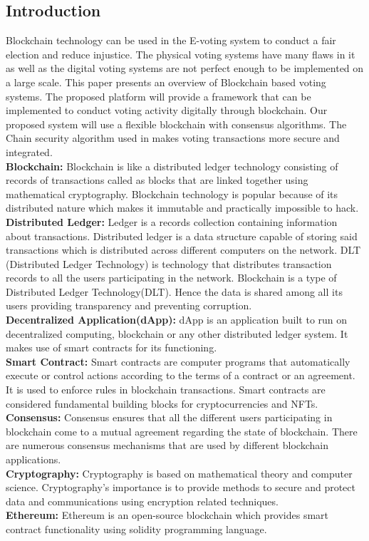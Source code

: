 \documentclass[oneside, 12pt]{book}
\begin{document}
		\subsection{Introduction}
			Blockchain technology can be used in the E-voting system to conduct a fair election and reduce injustice. The physical voting systems have many flaws in it as well as the digital voting systems are not perfect enough to be implemented on a large scale. This paper presents an overview of Blockchain based voting systems. The proposed platform will provide a framework that can be implemented to conduct voting activity digitally through blockchain. Our proposed system will use a flexible blockchain with consensus algorithms. The Chain security algorithm used in makes voting transactions more secure and integrated.
			\\\textbf{Blockchain:} Blockchain is like a distributed ledger technology consisting of records of transactions called as blocks that are linked together using mathematical cryptography. Blockchain technology is popular because of its distributed nature which makes it immutable and practically impossible to hack.
			\\\textbf{Distributed Ledger:} Ledger is a records collection containing information about transactions. Distributed ledger is a data structure capable of storing said transactions which is distributed across different computers on the network. DLT (Distributed Ledger Technology) is technology that distributes transaction records to all the users participating in the network. Blockchain is a type of Distributed Ledger Technology(DLT). Hence the data is shared among all its users providing transparency and preventing corruption.
			\\\textbf{Decentralized Application(dApp):} dApp is an application built to run on decentralized computing, blockchain or any other distributed ledger system. It makes use of smart contracts for its functioning.
			\\\textbf{Smart Contract:} Smart contracts are computer programs that automatically execute or control actions according to the terms of a contract or an agreement. It is used to enforce rules in blockchain transactions. Smart contracts are considered fundamental building blocks for cryptocurrencies and NFTs.
			\\\textbf{Consensus:} Consensus ensures that all the different users participating in blockchain come to a mutual agreement regarding the state of blockchain. There are numerous consensus mechanisms that are used by different blockchain applications.
			\\\textbf{Cryptography:} Cryptography is based on mathematical theory and computer science. Cryptography’s importance is to provide methods to secure and protect data and communications using encryption related techniques.
			\\\textbf{Ethereum:} Ethereum is an open-source blockchain which provides smart contract functionality using solidity programming language.
\end{document}
